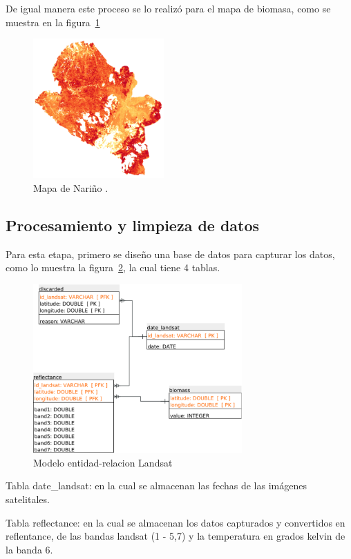 De igual manera este proceso se lo realizó para el mapa de biomasa, como se muestra en la figura~\ref{fig:mapaNarino}


\begin{figure}
  \centering
  \includegraphics[width = 5cm]{mapaNarino.png}
  \caption{Mapa de Nariño .}
  \label{fig:mapaNarino}
\end{figure}

\subsection{Procesamiento y limpieza de datos}

Para esta etapa, primero se diseño una base de datos para capturar los datos,
como lo muestra la figura~\ref{fig:landsatET}, la cual tiene 4 tablas. 

\begin{figure}
  \centering
  \includegraphics[width = 8cm]{landsatET.pdf}
  \caption{Modelo entidad-relacion Landsat}
  \label{fig:landsatET}
\end{figure}

Tabla date\_landsat: en la cual se almacenan las fechas de las imágenes satelitales.

Tabla reflectance: en la cual se almacenan los datos capturados y convertidos en reflentance,
de las bandas landsat (1 - 5,7) y la temperatura en grados kelvin de la banda 6.

